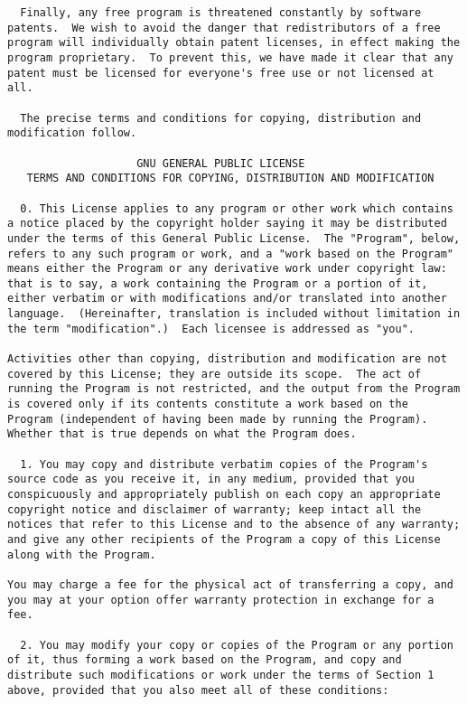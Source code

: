 \begin{verbatim}
  Finally, any free program is threatened constantly by software
patents.  We wish to avoid the danger that redistributors of a free
program will individually obtain patent licenses, in effect making the
program proprietary.  To prevent this, we have made it clear that any
patent must be licensed for everyone's free use or not licensed at all.

  The precise terms and conditions for copying, distribution and
modification follow.

                    GNU GENERAL PUBLIC LICENSE
   TERMS AND CONDITIONS FOR COPYING, DISTRIBUTION AND MODIFICATION

  0. This License applies to any program or other work which contains
a notice placed by the copyright holder saying it may be distributed
under the terms of this General Public License.  The "Program", below,
refers to any such program or work, and a "work based on the Program"
means either the Program or any derivative work under copyright law:
that is to say, a work containing the Program or a portion of it,
either verbatim or with modifications and/or translated into another
language.  (Hereinafter, translation is included without limitation in
the term "modification".)  Each licensee is addressed as "you".

Activities other than copying, distribution and modification are not
covered by this License; they are outside its scope.  The act of
running the Program is not restricted, and the output from the Program
is covered only if its contents constitute a work based on the
Program (independent of having been made by running the Program).
Whether that is true depends on what the Program does.

  1. You may copy and distribute verbatim copies of the Program's
source code as you receive it, in any medium, provided that you
conspicuously and appropriately publish on each copy an appropriate
copyright notice and disclaimer of warranty; keep intact all the
notices that refer to this License and to the absence of any warranty;
and give any other recipients of the Program a copy of this License
along with the Program.

You may charge a fee for the physical act of transferring a copy, and
you may at your option offer warranty protection in exchange for a fee.

  2. You may modify your copy or copies of the Program or any portion
of it, thus forming a work based on the Program, and copy and
distribute such modifications or work under the terms of Section 1
above, provided that you also meet all of these conditions:


\end{verbatim}
